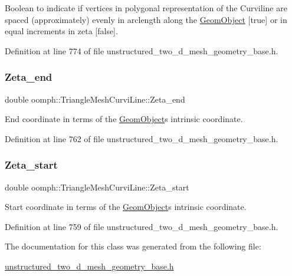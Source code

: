 Boolean to indicate if vertices in polygonal representation of the Curviline are spaced (approximately) evenly in arclength along the \hyperlink{classoomph_1_1GeomObject}{Geom\+Object} \mbox{[}true\mbox{]} or in equal increments in zeta \mbox{[}false\mbox{]}. 



Definition at line 774 of file unstructured\+\_\+two\+\_\+d\+\_\+mesh\+\_\+geometry\+\_\+base.\+h.

\mbox{\label{classoomph_1_1TriangleMeshCurviLine_a4e0eb74c99bee668bb97ac2e896b3ee0}} 
\subsubsection{\texorpdfstring{Zeta\+\_\+end}{Zeta\_end}}
{\footnotesize\ttfamily double oomph\+::\+Triangle\+Mesh\+Curvi\+Line\+::\+Zeta\+\_\+end\hspace{0.3cm}{\ttfamily [private]}}



End coordinate in terms of the \hyperlink{classoomph_1_1GeomObject}{Geom\+Object}\textquotesingle{}s intrinsic coordinate. 



Definition at line 762 of file unstructured\+\_\+two\+\_\+d\+\_\+mesh\+\_\+geometry\+\_\+base.\+h.

\mbox{\label{classoomph_1_1TriangleMeshCurviLine_aa89105fb5ab773ff8ee49fc32cf066d0}} 
\subsubsection{\texorpdfstring{Zeta\+\_\+start}{Zeta\_start}}
{\footnotesize\ttfamily double oomph\+::\+Triangle\+Mesh\+Curvi\+Line\+::\+Zeta\+\_\+start\hspace{0.3cm}{\ttfamily [private]}}



Start coordinate in terms of the \hyperlink{classoomph_1_1GeomObject}{Geom\+Object}\textquotesingle{}s intrinsic coordinate. 



Definition at line 759 of file unstructured\+\_\+two\+\_\+d\+\_\+mesh\+\_\+geometry\+\_\+base.\+h.



The documentation for this class was generated from the following file\+:\begin{DoxyCompactItemize}
\item 
\hyperlink{unstructured__two__d__mesh__geometry__base_8h}{unstructured\+\_\+two\+\_\+d\+\_\+mesh\+\_\+geometry\+\_\+base.\+h}\end{DoxyCompactItemize}
